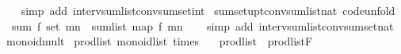 \begin{isabellebody}
%
\isadelimproof
\ \ %
\endisadelimproof
%
\isatagproof
{}\isamarkupfalse%
\ {\isacharparenleft}{\kern0pt}simp\ add{\isacharcolon}{\kern0pt}\ interv{\isacharunderscore}{\kern0pt}sum{\isacharunderscore}{\kern0pt}list{\isacharunderscore}{\kern0pt}conv{\isacharunderscore}{\kern0pt}sum{\isacharunderscore}{\kern0pt}set{\isacharunderscore}{\kern0pt}int{\isacharparenright}{\kern0pt}%
\endisatagproof
{\isafoldproof}%
%
\isadelimproof
\isanewline
%
\endisadelimproof
\isanewline
{}\isamarkupfalse%
\ sum{\isacharunderscore}{\kern0pt}set{\isacharunderscore}{\kern0pt}upt{\isacharunderscore}{\kern0pt}conv{\isacharunderscore}{\kern0pt}sum{\isacharunderscore}{\kern0pt}list{\isacharunderscore}{\kern0pt}nat\ {\isacharbrackleft}{\kern0pt}code{\isacharunderscore}{\kern0pt}unfold{\isacharbrackright}{\kern0pt}{\isacharcolon}{\kern0pt}\isanewline
\ \ {\isachardoublequoteopen}sum\ f\ {\isacharparenleft}{\kern0pt}set\ {\isacharbrackleft}{\kern0pt}m{\isachardot}{\kern0pt}{\isachardot}{\kern0pt}{\isacharless}{\kern0pt}n{\isacharbrackright}{\kern0pt}{\isacharparenright}{\kern0pt}\ {\isacharequal}{\kern0pt}\ sum{\isacharunderscore}{\kern0pt}list\ {\isacharparenleft}{\kern0pt}map\ f\ {\isacharbrackleft}{\kern0pt}m{\isachardot}{\kern0pt}{\isachardot}{\kern0pt}{\isacharless}{\kern0pt}n{\isacharbrackright}{\kern0pt}{\isacharparenright}{\kern0pt}{\isachardoublequoteclose}\isanewline
%
\isadelimproof
\ \ %
\endisadelimproof
%
\isatagproof
{}\isamarkupfalse%
\ {\isacharparenleft}{\kern0pt}simp\ add{\isacharcolon}{\kern0pt}\ interv{\isacharunderscore}{\kern0pt}sum{\isacharunderscore}{\kern0pt}list{\isacharunderscore}{\kern0pt}conv{\isacharunderscore}{\kern0pt}sum{\isacharunderscore}{\kern0pt}set{\isacharunderscore}{\kern0pt}nat{\isacharparenright}{\kern0pt}%
\endisatagproof
{\isafoldproof}%
%
\isadelimproof
%
\endisadelimproof
%
\isadelimdocument
%
\endisadelimdocument
%
\isatagdocument
%
\isamarkuptrue%
%
\endisatagdocument
{\isafolddocument}%
%
\isadelimdocument
%
\endisadelimdocument
{}\isamarkupfalse%
\ monoid{\isacharunderscore}{\kern0pt}mult\isanewline
{}\isanewline
\isanewline
{}\isamarkupfalse%
\ prod{\isacharunderscore}{\kern0pt}list{\isacharcolon}{\kern0pt}\ monoid{\isacharunderscore}{\kern0pt}list\ times\ {}\isanewline
{}\isanewline
\ \ prod{\isacharunderscore}{\kern0pt}list\ {\isacharequal}{\kern0pt}\ prod{\isacharunderscore}{\kern0pt}list{\isachardot}{\kern0pt}F%
\isadelimproof
\ %
\endisadelimproof
%
\isatagproof
\isacommand{{\isachardot}{\kern0pt}{\isachardot}{\kern0pt}}\isamarkupfalse%

\end{isabellebody}
